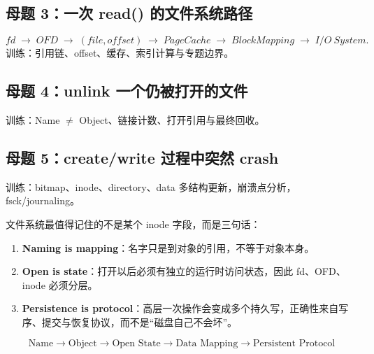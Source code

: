 \documentclass[11pt,a4paper]{ctexart}
\newcommand{\kw}[1]{\textbf{#1}}
\newcommand{\arr}{\;\longrightarrow\;}
\begin{document}
\subsection*{母题 3：一次 read() 的文件系统路径}
\[
fd\arr OFD\arr(file,offset)\arr PageCache\arr BlockMapping\arr I/O~System.
\]
训练：引用链、offset、缓存、索引计算与专题边界。

\subsection*{母题 4：unlink 一个仍被打开的文件}
训练：Name $\neq$ Object、链接计数、打开引用与最终回收。

\subsection*{母题 5：create/write 过程中突然 crash}
训练：bitmap、inode、directory、data 多结构更新，崩溃点分析，fsck/journaling。

\begin{corebox}[本册最终压缩]
文件系统最值得记住的不是某个 inode 字段，而是三句话：
\begin{enumerate}
  \item \kw{Naming is mapping}：名字只是到对象的引用，不等于对象本身。
  \item \kw{Open is state}：打开以后必须有独立的运行时访问状态，因此 fd、OFD、inode 必须分层。
  \item \kw{Persistence is protocol}：高层一次操作会变成多个持久写，正确性来自写序、提交与恢复协议，而不是“磁盘自己不会坏”。
\end{enumerate}
\[
\boxed{\text{Name}\to\text{Object}\to\text{Open State}\to\text{Data Mapping}\to\text{Persistent Protocol}}
\]
\end{corebox}
\end{document}
